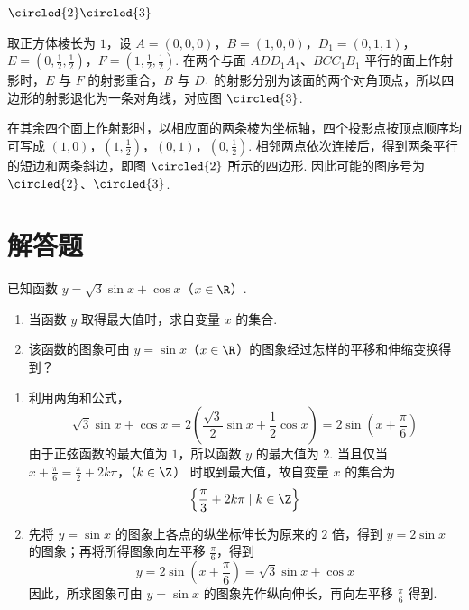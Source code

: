\begin{answer}
\(\circled{2}\circled{3}\)
\end{answer}

\begin{solution}
取正方体棱长为 \(1\)，设
\(A=(0,0,0)\)，\(B=(1,0,0)\)，\(D_1=(0,1,1)\)，\(E=\left(0,\frac12,\frac12\right)\)，\(F=\left(1,\frac12,\frac12\right)\).
在两个与面 \(ADD_1A_1\)、\(BCC_1B_1\) 平行的面上作射影时，\(E\) 与 \(F\) 的射影重合，\(B\) 与 \(D_1\) 的射影分别为该面的两个对角顶点，所以四边形的射影退化为一条对角线，对应图 \(\circled{3}\).

在其余四个面上作射影时，以相应面的两条棱为坐标轴，四个投影点按顶点顺序均可写成
\(\left(1,0\right)\)，\(\left(1,\frac12\right)\)，\(\left(0,1\right)\)，\(\left(0,\frac12\right)\).
相邻两点依次连接后，得到两条平行的短边和两条斜边，即图 \(\circled{2}\) 所示的四边形. 因此可能的图序号为 \(\circled{2}\)、\(\circled{3}\).
\end{solution}

\section{解答题}

\begin{problem}
已知函数 \(y=\sqrt{3}\sin x+\cos x\)（\(x\in\R\)）.

\begin{enumerate}
\item 当函数 \(y\) 取得最大值时，求自变量 \(x\) 的集合.
\item 该函数的图象可由 \(y=\sin x\)（\(x\in\R\)）的图象经过怎样的平移和伸缩变换得到？
\end{enumerate}
\end{problem}

\begin{solution}
\begin{enumerate}
\item 利用两角和公式，
\[
\sqrt{3}\sin x+\cos x
=2\left(\frac{\sqrt{3}}{2}\sin x+\frac{1}{2}\cos x\right)
=2\sin\left(x+\frac{\pi}{6}\right)
\]
由于正弦函数的最大值为 \(1\)，所以函数 \(y\) 的最大值为 \(2\). 当且仅当
\(x+\frac{\pi}{6}=\frac{\pi}{2}+2k\pi\)，（\(k\in\Z\)）
时取到最大值，故自变量 \(x\) 的集合为
\[
\left\{\frac{\pi}{3}+2k\pi\mid k\in\Z\right\}
\]
\item 先将 \(y=\sin x\) 的图象上各点的纵坐标伸长为原来的 \(2\) 倍，得到 \(y=2\sin x\) 的图象；再将所得图象向左平移 \(\frac{\pi}{6}\)，得到
\[
y=2\sin\left(x+\frac{\pi}{6}\right)=\sqrt{3}\sin x+\cos x
\]
因此，所求图象可由 \(y=\sin x\) 的图象先作纵向伸长，再向左平移 \(\frac{\pi}{6}\) 得到.
\end{enumerate}
\end{solution}

